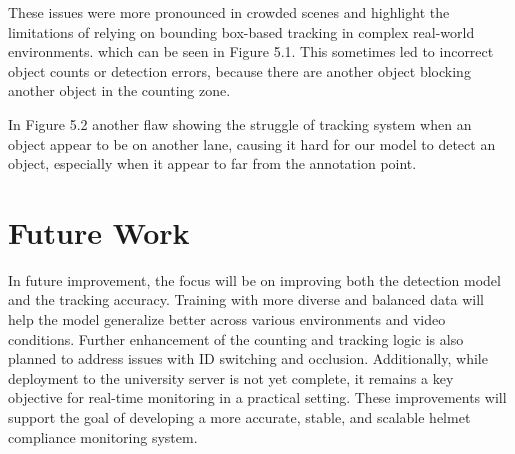  These issues were more pronounced in crowded scenes and highlight the limitations of relying on bounding box-based tracking in complex real-world environments. which can be seen in Figure 5.1. This sometimes led to incorrect object counts or detection errors, because there are another object blocking another object in the counting zone. 

In Figure 5.2 another flaw showing the struggle of tracking system when an object appear to be on another lane, causing it hard for our model to detect an object, especially when it appear to far from the annotation point.


\section{Future Work}
\setlength{\parindent}{2.5em}
In future improvement, the focus will be on improving both the detection model and the tracking accuracy. Training with more diverse and balanced data will help the model generalize better across various environments and video conditions. Further enhancement of the counting and tracking logic is also planned to address issues with ID switching and occlusion. Additionally, while deployment to the university server is not yet complete, it remains a key objective for real-time monitoring in a practical setting. These improvements will support the goal of developing a more accurate, stable, and scalable helmet compliance monitoring system.



